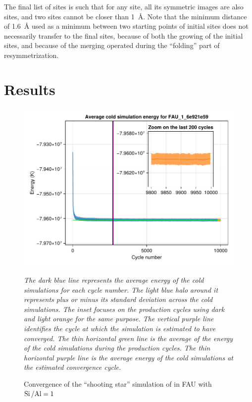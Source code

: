 \documentclass[main.tex]{subfiles}
\begin{document}
The final list of sites is such that for any site, all its symmetric images are also sites, and two sites cannot be closer than \qty{1}{\angstrom}. Note that the minimum distance of \qty{1.6}{\angstrom} used as a minimum between two starting points of initial sites does not necessarily transfer to the final sites, because of both the growing of the initial sites, and because of the merging operated during the ``folding'' part of resymmetrization.

\section{Results}

\begin{figure}
	{\centering
	\includegraphics[width=\columnwidth]{figures/cations/convergenceFAUshootingstar.pdf}
	\caption{Convergence of the ``shooting star'' simulation of  in FAU with $\mbox{Si\,/Al} = 1$\\}\label{fig:convergenceFAUshootingstar}

	\sl The dark blue line represents the average energy of the cold simulations for each cycle number. The light blue halo around it represents plus or minus its standard deviation across the cold simulations. The inset focuses on the production cycles using dark and light orange for the same purpose. The vertical purple line identifies the cycle at which the simulation is estimated to have converged. The thin horizontal green line is the average of the energy of the cold simulations during the production cycles. The thin horizontal purple line is the average energy of the cold simulations at the estimated convergence cycle.}
\end{figure}
\end{document}
